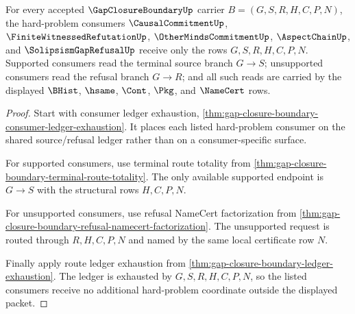 \begin{theorem}
\label{thm:gap-closure-boundary-consumer-surface-exhaustion}
For every accepted $\GapClosureBoundaryUp$ carrier $B=(G,S,R,H,C,P,N)$, the hard-problem consumers $\CausalCommitmentUp$, $\FiniteWitnessedRefutationUp$, $\OtherMindsCommitmentUp$, $\AspectChainUp$, and $\SolipsismGapRefusalUp$ receive only the rows $G,S,R,H,C,P,N$. Supported consumers read the terminal source branch $G \longrightarrow S$; unsupported consumers read the refusal branch $G \longrightarrow R$; and all such reads are carried by the displayed $\BHist$, $\hsame$, $\Cont$, $\Pkg$, and $\NameCert$ rows.
\end{theorem}
\begin{proof}
Start with consumer ledger exhaustion, \autoref{thm:gap-closure-boundary-consumer-ledger-exhaustion}. It places each listed hard-problem consumer on the shared source/refusal ledger rather than on a consumer-specific surface.

For supported consumers, use terminal route totality from \autoref{thm:gap-closure-boundary-terminal-route-totality}. The only available supported endpoint is $G \longrightarrow S$ with the structural rows $H,C,P,N$.

For unsupported consumers, use refusal NameCert factorization from \autoref{thm:gap-closure-boundary-refusal-namecert-factorization}. The unsupported request is routed through $R,H,C,P,N$ and named by the same local certificate row $N$.

Finally apply route ledger exhaustion from \autoref{thm:gap-closure-boundary-ledger-exhaustion}. The ledger is exhausted by $G,S,R,H,C,P,N$, so the listed consumers receive no additional hard-problem coordinate outside the displayed packet.
\end{proof}
